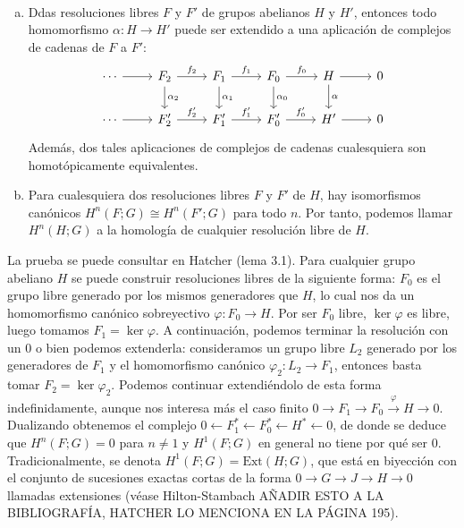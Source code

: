\documentclass[TA.tex]{subfiles}
\begin{document}
\begin{lemma}\
\begin{enumerate}[(a)]
\item Ddas resoluciones libres $F$ y $F'$ de grupos abelianos $H$ y $H'$, entonces todo homomorfismo $\alpha:H\to H'$ puede ser extendido a una aplicación de complejos de cadenas de $F$ a $F'$:
\[
\begin{tikzcd}
\cdots\arrow[r]& F_2\arrow[r, "f_2"]\arrow[d, "\alpha_2"] & F_1\arrow[r, "f_1"]\arrow[d, "\alpha_1"] & F_0\arrow[r, "f_0"]\arrow[d, "\alpha_0"]&H\arrow[d, "\alpha"]\arrow[r] & 0\\
\cdots\arrow[r]& F_2'\arrow[r, "f_2'"] & F_1'\arrow[r, "f_1'"] & F_0'\arrow[r, "f_0'"]&H'\arrow[r] & 0
\end{tikzcd}
\]
Además, dos tales aplicaciones de complejos de cadenas cualesquiera son homotópicamente equivalentes.

\item Para cualesquiera dos resoluciones libres $F$ y $F'$ de $H$, hay isomorfismos canónicos $H^n(F;G)\cong H^n(F';G)$ para todo $n$. Por tanto, podemos llamar $H^n(H;G)$ a la homología de cualquier resolución libre de $H$.
\end{enumerate}
\end{lemma}
La prueba se puede consultar en Hatcher (lema 3.1). Para cualquier grupo abeliano $H$ se puede construir resoluciones libres de la siguiente forma: $F_0$ es el grupo libre generado por los mismos generadores que $H$, lo cual nos da un homomorfismo canónico sobreyectivo $\varphi:F_0\to H$. Por ser $F_0$ libre, $\ker\varphi$ es libre, luego tomamos $F_1=\ker\varphi$. A continuación, podemos terminar la resolución con un 0 o bien podemos extenderla: consideramos un grupo libre $L_2$ generado por los generadores de $F_1$ y el homomorfismo canónico $\varphi_2:L_2\to F_1$, entonces basta tomar $F_2=\ker\varphi_2$. Podemos continuar extendiéndolo de esta forma indefinidamente, aunque nos interesa más el caso finito $0\to F_1\to F_0\xrightarrow{\varphi} H\to 0$. Dualizando obtenemos el complejo $0\leftarrow F_1^*\leftarrow F_0^*\leftarrow H^*\leftarrow 0$, de donde se deduce que $H^n(F;G)=0$ para $n\neq 1$ y $H^1(F;G)$ en general no tiene por qué ser 0. Tradicionalmente, se denota $H^1(F;G)=\mathrm{Ext}(H;G)$, que está en biyección con el conjunto de sucesiones exactas cortas de la forma $0\to G\to J\to H\to 0$ llamadas extensiones (véase Hilton-Stambach AÑADIR ESTO A LA BIBLIOGRAFÍA, HATCHER LO MENCIONA EN LA PÁGINA 195).
\end{document}
